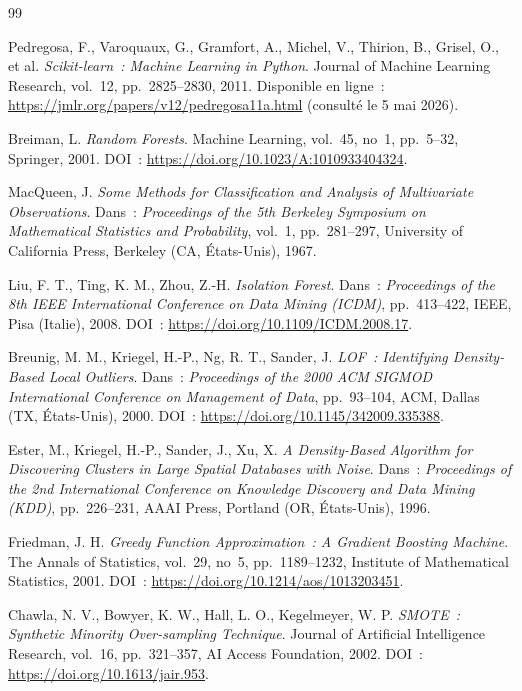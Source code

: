 \begin{thebibliography}{99}

Pedregosa, F., Varoquaux, G., Gramfort, A., Michel, V., Thirion, B., Grisel, O., et al.
\emph{Scikit-learn~: Machine Learning in Python}.
Journal of Machine Learning Research, vol.~12, pp.~2825--2830, 2011.
Disponible en ligne~: \url{https://jmlr.org/papers/v12/pedregosa11a.html}
(consulté le 5 mai 2026).

Breiman, L.
\emph{Random Forests}.
Machine Learning, vol.~45, no~1, pp.~5--32, Springer, 2001.
DOI~: \url{https://doi.org/10.1023/A:1010933404324}.

MacQueen, J.
\emph{Some Methods for Classification and Analysis of Multivariate Observations}.
Dans~: \emph{Proceedings of the 5th Berkeley Symposium on Mathematical Statistics and Probability},
vol.~1, pp.~281--297, University of California Press, Berkeley (CA, États-Unis), 1967.

Liu, F. T., Ting, K. M., Zhou, Z.-H.
\emph{Isolation Forest}.
Dans~: \emph{Proceedings of the 8th IEEE International Conference on Data Mining (ICDM)},
pp.~413--422, IEEE, Pisa (Italie), 2008.
DOI~: \url{https://doi.org/10.1109/ICDM.2008.17}.

Breunig, M. M., Kriegel, H.-P., Ng, R. T., Sander, J.
\emph{LOF~: Identifying Density-Based Local Outliers}.
Dans~: \emph{Proceedings of the 2000 ACM SIGMOD International Conference on Management of Data},
pp.~93--104, ACM, Dallas (TX, États-Unis), 2000.
DOI~: \url{https://doi.org/10.1145/342009.335388}.

Ester, M., Kriegel, H.-P., Sander, J., Xu, X.
\emph{A Density-Based Algorithm for Discovering Clusters in Large Spatial Databases with Noise}.
Dans~: \emph{Proceedings of the 2nd International Conference on Knowledge Discovery and Data Mining (KDD)},
pp.~226--231, AAAI Press, Portland (OR, États-Unis), 1996.

Friedman, J. H.
\emph{Greedy Function Approximation~: A Gradient Boosting Machine}.
The Annals of Statistics, vol.~29, no~5, pp.~1189--1232, Institute of Mathematical Statistics, 2001.
DOI~: \url{https://doi.org/10.1214/aos/1013203451}.

Chawla, N. V., Bowyer, K. W., Hall, L. O., Kegelmeyer, W. P.
\emph{SMOTE~: Synthetic Minority Over-sampling Technique}.
Journal of Artificial Intelligence Research, vol.~16, pp.~321--357, AI Access Foundation, 2002.
DOI~: \url{https://doi.org/10.1613/jair.953}.


\end{thebibliography}
